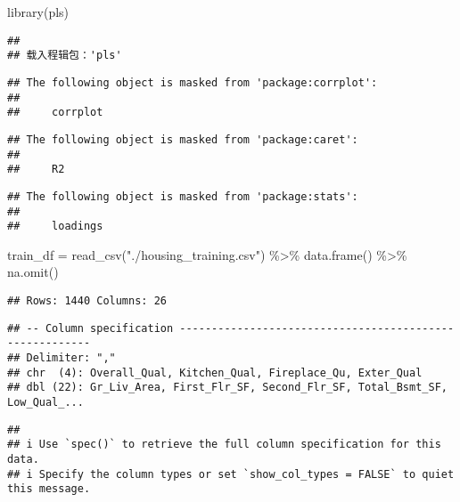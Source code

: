 \documentclass[
]{article}
\newenvironment{Shaded}{\begin{snugshade}}{\end{snugshade}}
\newcommand{\FunctionTok}[1]{\textcolor[rgb]{0.00,0.00,0.00}{#1}}
\newcommand{\NormalTok}[1]{#1}
\newcommand{\OtherTok}[1]{\textcolor[rgb]{0.56,0.35,0.01}{#1}}
\newcommand{\SpecialCharTok}[1]{\textcolor[rgb]{0.00,0.00,0.00}{#1}}
\newcommand{\StringTok}[1]{\textcolor[rgb]{0.31,0.60,0.02}{#1}}
\begin{document}
\begin{Shaded}
\begin{Highlighting}[]
\FunctionTok{library}\NormalTok{(pls)}
\end{Highlighting}
\end{Shaded}

\begin{verbatim}
## 
## 载入程辑包：'pls'
\end{verbatim}

\begin{verbatim}
## The following object is masked from 'package:corrplot':
## 
##     corrplot
\end{verbatim}

\begin{verbatim}
## The following object is masked from 'package:caret':
## 
##     R2
\end{verbatim}

\begin{verbatim}
## The following object is masked from 'package:stats':
## 
##     loadings
\end{verbatim}

\begin{Shaded}
\begin{Highlighting}[]
\NormalTok{train\_df }\OtherTok{=} \FunctionTok{read\_csv}\NormalTok{(}\StringTok{"./housing\_training.csv"}\NormalTok{) }\SpecialCharTok{\%\textgreater{}\%} 
  \FunctionTok{data.frame}\NormalTok{() }\SpecialCharTok{\%\textgreater{}\%} 
  \FunctionTok{na.omit}\NormalTok{()}
\end{Highlighting}
\end{Shaded}

\begin{verbatim}
## Rows: 1440 Columns: 26
\end{verbatim}

\begin{verbatim}
## -- Column specification --------------------------------------------------------
## Delimiter: ","
## chr  (4): Overall_Qual, Kitchen_Qual, Fireplace_Qu, Exter_Qual
## dbl (22): Gr_Liv_Area, First_Flr_SF, Second_Flr_SF, Total_Bsmt_SF, Low_Qual_...
\end{verbatim}

\begin{verbatim}
## 
## i Use `spec()` to retrieve the full column specification for this data.
## i Specify the column types or set `show_col_types = FALSE` to quiet this message.
\end{verbatim}
\end{document}
